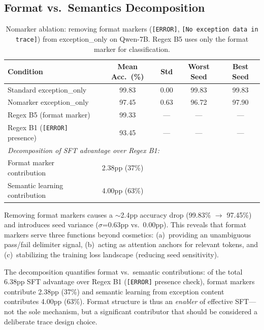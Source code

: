 \documentclass[11pt]{article}
\begin{document}
\subsection{Format vs.\ Semantics Decomposition}

\begin{table}[h]
\centering
\caption{Nomarker ablation: removing format markers (\texttt{[ERROR]}, \texttt{[No exception data in trace]}) from exception\_only on Qwen-7B. Regex B5 uses only the format marker for classification.}
\label{tab:nomarker}
\small
\begin{tabular}{lcccc}
\toprule
\textbf{Condition} & \textbf{Mean Acc.\ (\%)} & \textbf{Std} & \textbf{Worst Seed} & \textbf{Best Seed} \\
\midrule
Standard exception\_only & 99.83 & 0.00 & 99.83 & 99.83 \\
Nomarker exception\_only & 97.45 & 0.63 & 96.72 & 97.90 \\
Regex B5 (format marker) & 99.33 & --- & --- & --- \\
Regex B1 (\texttt{[ERROR]} presence) & 93.45 & --- & --- & --- \\
\midrule
\multicolumn{5}{l}{\textit{Decomposition of SFT advantage over Regex B1:}} \\
\quad Format marker contribution & \multicolumn{4}{l}{2.38pp (37\%)} \\
\quad Semantic learning contribution & \multicolumn{4}{l}{4.00pp (63\%)} \\
\bottomrule
\end{tabular}
\end{table}

Removing format markers causes a $\sim$2.4pp accuracy drop (99.83\% $\rightarrow$ 97.45\%) and introduces seed variance ($\sigma$=0.63pp vs.\ 0.00pp). This reveals that format markers serve three functions beyond cosmetics: (a)~providing an unambiguous pass/fail delimiter signal, (b)~acting as attention anchors for relevant tokens, and (c)~stabilizing the training loss landscape (reducing seed sensitivity).

The decomposition quantifies format vs.\ semantic contributions: of the total 6.38pp SFT advantage over Regex B1 (\texttt{[ERROR]} presence check), format markers contribute 2.38pp (37\%) and semantic learning from exception content contributes 4.00pp (63\%). Format structure is thus an \emph{enabler} of effective SFT---not the sole mechanism, but a significant contributor that should be considered a deliberate trace design choice.
\end{document}
